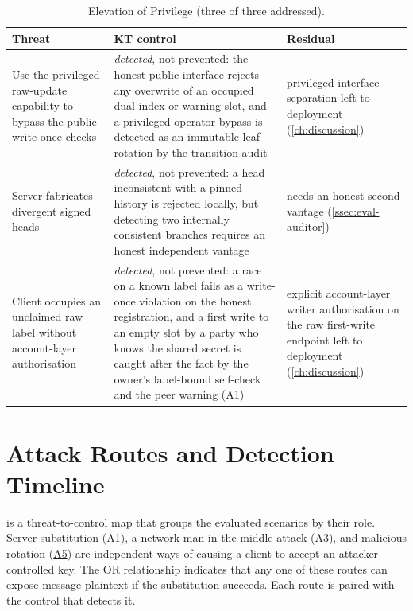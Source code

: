 \begin{table}[H]
\centering
\caption{Elevation of Privilege (three of three addressed).}
\label{tab:stride-e}
\setlength{\extrarowheight}{2pt}
\footnotesize
\setlength{\tabcolsep}{9pt}\renewcommand{\arraystretch}{1.25}
\begin{tabular}{@{}>{\raggedright\arraybackslash}p{4.4cm}>{\raggedright\arraybackslash}p{5.2cm}>{\raggedright\arraybackslash}p{4.0cm}@{}}
\toprule
Threat & KT control & Residual \\
\midrule
Use the privileged raw-update capability to bypass the public write-once checks & \emph{detected}, not prevented: the honest public interface rejects any overwrite of an occupied dual-index or warning slot, and a privileged operator bypass is detected as an immutable-leaf rotation by the transition audit & privileged-interface separation left to deployment (\cref{ch:discussion}) \\
Server fabricates divergent signed heads & \emph{detected}, not prevented: a head inconsistent with a pinned history is rejected locally, but detecting two internally consistent branches requires an honest independent vantage & needs an honest second vantage (\cref{ssec:eval-auditor}) \\
Client occupies an unclaimed raw label without account-layer authorisation & \emph{detected}, not prevented: a race on a known label fails as a write-once violation on the honest registration, and a first write to an empty slot by a party who knows the shared secret is caught after the fact by the owner's label-bound self-check and the peer warning (A1) & explicit account-layer writer authorisation on the raw first-write endpoint left to deployment (\cref{ch:discussion}) \\
\bottomrule
\end{tabular}
\end{table}

\FloatBarrier
\section{Attack Routes and Detection Timeline}\label{sec:sec-routes}

 is a threat-to-control map that groups the evaluated scenarios by their role. Server substitution (A1), a
network man-in-the-middle attack (A3), and malicious rotation (\hyperref[sc:threat-a5]{A5}) are independent ways of causing a
client to accept an attacker-controlled key. The OR relationship indicates that any one of these
routes can expose message plaintext if the substitution succeeds. Each route is paired with the
control that detects it.

